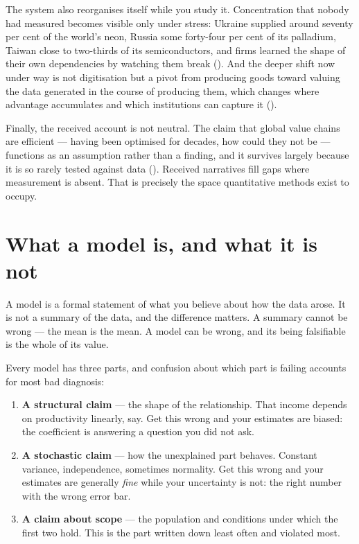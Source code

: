 \documentclass[
  letterpaper,
  10pt,
  twoside,
  openright,
  numbers=noenddot,
  chapterprefix=true]{scrbook}
\providecommand{\tightlist}{%
  \setlength{\itemsep}{0pt}\setlength{\parskip}{0pt}}
\begin{document}
The system also reorganises itself while you study it. Concentration
that nobody had measured becomes visible only under stress: Ukraine
supplied around seventy per cent of the world's neon, Russia some
forty-four per cent of its palladium, Taiwan close to two-thirds of its
semiconductors, and firms learned the shape of their own dependencies by
watching them break (). And
the deeper shift now under way is not digitisation but a pivot from
producing goods toward valuing the data generated in the course of
producing them, which changes where advantage accumulates and which
institutions can capture it ().

Finally, the received account is not neutral. The claim that global
value chains are efficient --- having been optimised for decades, how
could they not be --- functions as an assumption rather than a finding,
and it survives largely because it is so rarely tested against data
(). Received narratives
fill gaps where measurement is absent. That is precisely the space
quantitative methods exist to occupy.

\section{What a model is, and what it is
not}\label{what-a-model-is-and-what-it-is-not}

A model is a formal statement of what you believe about how the data
arose. It is not a summary of the data, and the difference matters. A
summary cannot be wrong --- the mean is the mean. A model can be wrong,
and its being falsifiable is the whole of its value.

Every model has three parts, and confusion about which part is failing
accounts for most bad diagnosis:

\begin{enumerate}
\def\labelenumi{\arabic{enumi}.}
\tightlist
\item
  \textbf{A structural claim} --- the shape of the relationship. That
  income depends on productivity linearly, say. Get this wrong and your
  estimates are biased: the coefficient is answering a question you did
  not ask.
\item
  \textbf{A stochastic claim} --- how the unexplained part behaves.
  Constant variance, independence, sometimes normality. Get this wrong
  and your estimates are generally \emph{fine} while your uncertainty is
  not: the right number with the wrong error bar.
\item
  \textbf{A claim about scope} --- the population and conditions under
  which the first two hold. This is the part written down least often
  and violated most.
\end{enumerate}
\end{document}
